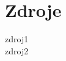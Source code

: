 \documentclass{article}
\begin{document}

\section{Zdroje}
zdroj1\cite{9904386}\\zdroj2\cite{7956539}


\end{document}
